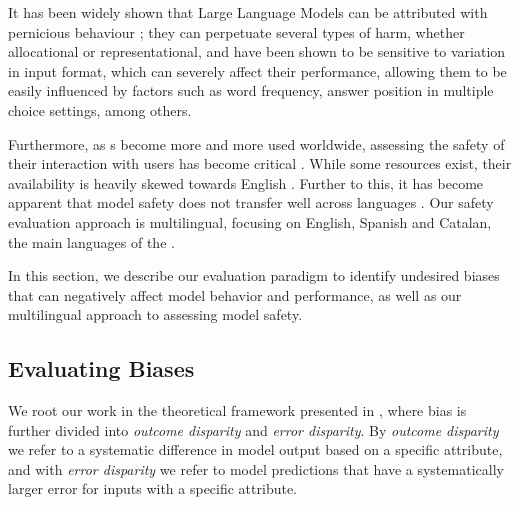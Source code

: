 \label{subsec:bias}

It has been widely shown that Large Language Models can be attributed with pernicious behaviour \cite{bender_dangers_2021}; they can perpetuate several types of harm, whether allocational or representational, and have been shown to be sensitive to variation in input format, which can severely affect their performance, allowing them to be easily influenced by factors such as word frequency, answer position in multiple choice settings, among others.

Furthermore, as \LLM{}s become more and more used worldwide, assessing the safety of their interaction with users has become critical \cite{yao_safety_security_survey,chowdhury_attack_survey}. While some resources exist, their availability is heavily skewed towards English \cite{yong_multilingual_adv_bench,joshi_dialect_evaluation_survey}. Further to this, it has become apparent that model safety does not transfer well across languages \cite{llama3, dang_multilingual_rlhf}. Our safety evaluation approach is multilingual, focusing on English, Spanish and Catalan, the main languages of the \SalamandraFamily{}.  

In this section, we describe our evaluation paradigm to identify undesired biases that can negatively affect model behavior and performance, as well as our multilingual approach to assessing model safety. 


\subsection{Evaluating Biases}
We root our work in the theoretical framework presented in \cite{theoretical_bias}, where bias is further divided into \textit{outcome disparity} and \textit{error disparity}. By \textit{outcome disparity} we refer to a systematic difference in model output based on a specific attribute, and with \textit{error disparity} we refer to model predictions that have a systematically larger error for inputs with a specific attribute.    





